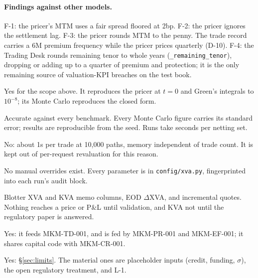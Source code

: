 \documentclass[11pt,a4paper]{article}
\begin{document}
\paragraph{Findings against other models.} F-1: the pricer's MTM uses a fair
spread floored at 2bp. F-2: the pricer ignores the settlement lag. F-3: the
pricer rounds MTM to the penny. The trade record carries a 6M premium
frequency while the pricer prices quarterly (D-10). F-4: the Trading Desk
rounds remaining tenor to whole years (\texttt{\_remaining\_tenor}), dropping or
adding up to a quarter of premium and protection; it is the only remaining
source of valuation-KPI breaches on the test book.

\mkmgovernance

Yes for the scope above. It reproduces the pricer at $t=0$ and Green's
integrals to $10^{-8}$; its Monte Carlo reproduces the closed form.

Accurate against every benchmark. Every Monte Carlo figure carries its
standard error; results are reproducible from the seed. Runs take seconds per
netting set.

No: about 1s per trade at 10{,}000 paths, memory independent of trade count.
It is kept out of per-request revaluation for this reason.

No manual overrides exist. Every parameter is in \texttt{config/xva.py},
fingerprinted into each run's audit block.

Blotter XVA and KVA memo columns, EOD $\Delta$XVA, and incremental quotes.
Nothing reaches a price or P\&L until validation, and KVA not until the
regulatory paper is answered.

Yes: it feeds MKM-TD-001, and is fed by MKM-PR-001 and MKM-EF-001; it shares
capital code with MKM-CR-001.

Yes: \S\ref{sec:limits}. The material ones are placeholder inputs (credit,
funding, $\sigma$), the open regulatory treatment, and L-1.
\end{document}
